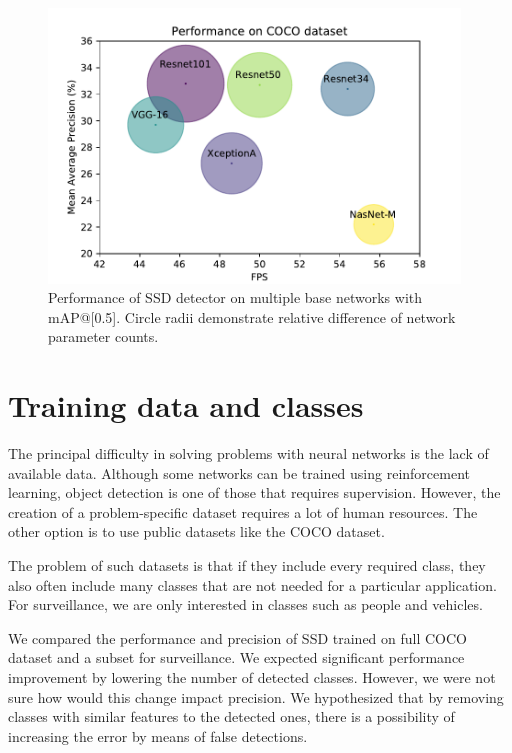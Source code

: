 \begin{figure}
    \centering
    \includegraphics[width=0.975\textwidth]{img/fps_map_c}
    \caption[Performance of SSD with multiple base networks on COCO dataset]{Performance of SSD detector on multiple base networks with mAP@[0.5]. Circle radii demonstrate relative difference of network parameter counts. }
    \label{fig:cocoperf}
\end{figure}

\section{Training data and classes}
The principal difficulty in solving problems with neural networks is the lack of available data. Although some networks can be trained using reinforcement learning, object detection is one of those that requires supervision. However, the creation of a problem-specific dataset requires a lot of human resources. The other option is to use public datasets like the COCO dataset. 

The problem of such datasets is that if they include every required class, they also often include many classes that are not needed for a particular application. For surveillance, we are only interested in classes such as people and vehicles. 

We compared the performance and precision of SSD trained on full COCO dataset and a subset for surveillance. We expected significant performance improvement by lowering the number of detected classes. However, we were not sure how would this change impact precision. We hypothesized that by removing classes with similar features to the detected ones, there is a possibility of increasing the error by means of false detections.

